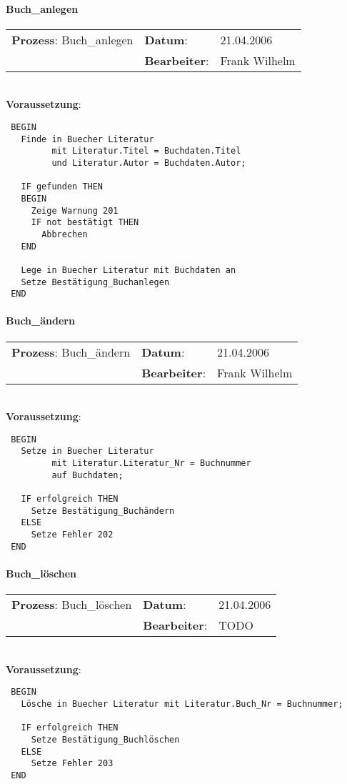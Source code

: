 \paragraph{Buch\_anlegen}
\begin{tabular}[t]{p{9.5cm}ll}
\textbf{Prozess}: Buch\_anlegen  	&\textbf{Datum}:      &21.04.2006\\
					&\textbf{Bearbeiter}: &Frank Wilhelm\\
\end{tabular}

\hrulefill\\
\textbf{Voraussetzung}:
\begin{verbatim}
 BEGIN
   Finde in Buecher Literatur
         mit Literatur.Titel = Buchdaten.Titel
         und Literatur.Autor = Buchdaten.Autor;
 
   IF gefunden THEN
   BEGIN
     Zeige Warnung 201
     IF not bestätigt THEN
       Abbrechen
   END
   
   Lege in Buecher Literatur mit Buchdaten an
   Setze Bestätigung_Buchanlegen
 END
\end{verbatim}
\hrulefill



\paragraph{Buch\_ändern}
\begin{tabular}[t]{p{9.5cm}ll}
\textbf{Prozess}: Buch\_ändern  	&\textbf{Datum}:      &21.04.2006\\
					&\textbf{Bearbeiter}: &Frank Wilhelm\\
\end{tabular}

\hrulefill\\
\textbf{Voraussetzung}:
\begin{verbatim}
 BEGIN
   Setze in Buecher Literatur
         mit Literatur.Literatur_Nr = Buchnummer
         auf Buchdaten;
  
   IF erfolgreich THEN
     Setze Bestätigung_Buchändern
   ELSE
     Setze Fehler 202
 END
\end{verbatim}
\hrulefill



\paragraph{Buch\_löschen}
\begin{tabular}[t]{p{9.5cm}ll}
\textbf{Prozess}: Buch\_löschen  	&\textbf{Datum}:      &21.04.2006\\
					&\textbf{Bearbeiter}: &TODO\\
\end{tabular}

\hrulefill\\
\textbf{Voraussetzung}:
\begin{verbatim}
 BEGIN
   Lösche in Buecher Literatur mit Literatur.Buch_Nr = Buchnummer;
   
   IF erfolgreich THEN
     Setze Bestätigung_Buchlöschen
   ELSE
     Setze Fehler 203
 END
\end{verbatim}
\hrulefill
